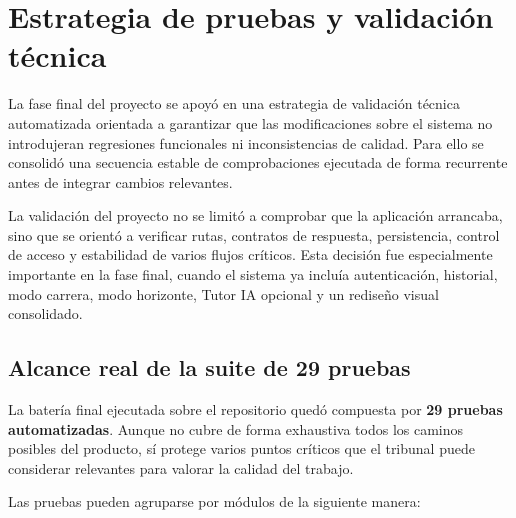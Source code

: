 \section{Estrategia de pruebas y validación técnica}

La fase final del proyecto se apoyó en una estrategia de validación técnica automatizada orientada a garantizar que las modificaciones sobre el sistema no introdujeran regresiones funcionales ni inconsistencias de calidad. Para ello se consolidó una secuencia estable de comprobaciones ejecutada de forma recurrente antes de integrar cambios relevantes.



La validación del proyecto no se limitó a comprobar que la aplicación arrancaba, sino que se orientó a verificar rutas, contratos de respuesta, persistencia, control de acceso y estabilidad de varios flujos críticos. Esta decisión fue especialmente importante en la fase final, cuando el sistema ya incluía autenticación, historial, modo carrera, modo horizonte, Tutor IA opcional y un rediseño visual consolidado.

\subsection{Alcance real de la suite de 29 pruebas}

La batería final ejecutada sobre el repositorio quedó compuesta por \textbf{29 pruebas automatizadas}. Aunque no cubre de forma exhaustiva todos los caminos posibles del producto, sí protege varios puntos críticos que el tribunal puede considerar relevantes para valorar la calidad del trabajo.

Las pruebas pueden agruparse por módulos de la siguiente manera:

